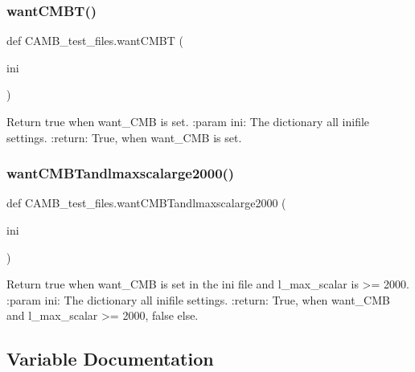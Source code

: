 \subsubsection{\texorpdfstring{want\+C\+M\+B\+T()}{wantCMBT()}}
{\footnotesize\ttfamily def C\+A\+M\+B\+\_\+test\+\_\+files.\+want\+C\+M\+BT (\begin{DoxyParamCaption}\item[{}]{ini }\end{DoxyParamCaption})}

\begin{DoxyVerb}Return true when want_CMB is set.
:param ini: The dictionary all inifile settings.
:return: True, when want_CMB is set.
\end{DoxyVerb}
 \mbox{\label{namespaceCAMB__test__files_af180889cae33202fe38467a5104dc783}} 
\subsubsection{\texorpdfstring{want\+C\+M\+B\+Tandlmaxscalarge2000()}{wantCMBTandlmaxscalarge2000()}}
{\footnotesize\ttfamily def C\+A\+M\+B\+\_\+test\+\_\+files.\+want\+C\+M\+B\+Tandlmaxscalarge2000 (\begin{DoxyParamCaption}\item[{}]{ini }\end{DoxyParamCaption})}

\begin{DoxyVerb}Return true when want_CMB is set in the ini file and l_max_scalar is >= 2000.
:param ini: The dictionary all inifile settings.
:return: True, when want_CMB and l_max_scalar >= 2000, false else.
\end{DoxyVerb}
 

\subsection{Variable Documentation}
\mbox{\label{namespaceCAMB__test__files_a51e0ffc6519b279097bc3783fc657a3f}} 

